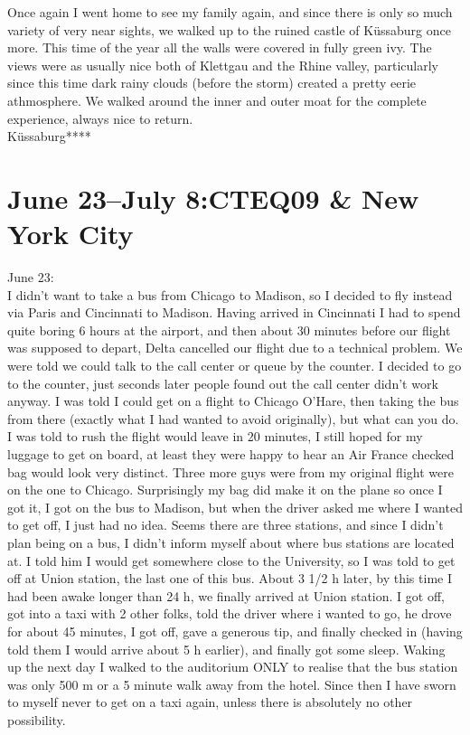 Once again I went home to see my family again, and since there is only so much variety of very near sights, we walked up to the ruined castle of K\"ussaburg once more. This time of the year all the walls were covered in fully green ivy. The views were as usually nice both of Klettgau and the Rhine valley, particularly since this time dark rainy clouds (before the storm) created a pretty eerie athmosphere. We walked around the inner and outer moat for the complete experience, always nice to return.\\

K\"ussaburg****

\section{June 23--July 8:CTEQ09 \& New York City}
\label{2009:US}

June 23:\\
I didn't want to take a bus from Chicago to Madison, so I decided to fly instead via Paris and Cincinnati to Madison. Having arrived in Cincinnati I had to spend quite boring 6 hours at the airport, and then about 30 minutes before our flight was supposed to depart, Delta cancelled our flight due to a technical problem. We were told we could talk to the call center or queue by the counter. I decided to go to the counter, just seconds later people found out the call center didn't work anyway. I was told I could get on a flight to Chicago O'Hare, then taking the bus from there (exactly what I had wanted to avoid originally), but what can you do. I was told to rush the flight would leave in 20 minutes, I still hoped for my luggage to get on board, at least they were happy to hear an Air France checked bag would look very distinct. Three more guys were from my original flight were on the one to Chicago. Surprisingly my bag did make it on the plane so once I got it, I got on the bus to Madison, but when the driver asked me where I wanted to get off, I just had no idea. Seems there are three stations, and since I didn't plan being on a bus, I didn't inform myself about where bus stations are located at. I told him I would get somewhere close to the University, so I was told to get off at Union station, the last one of this bus. About 3 1/2 h later, by this time I had been awake longer than 24 h, we finally arrived at Union station. I got off, got into a taxi with 2 other folks, told the driver where i wanted to go, he drove for about 45 minutes, I got off, gave a generous tip, and finally checked in (having told them I would arrive about 5 h earlier), and finally got some sleep. Waking up the next day I walked to the auditorium ONLY to realise that the bus station was only 500 m or a 5 minute walk away from the hotel. Since then I have sworn to myself never to get on a taxi again, unless there is absolutely no other possibility.\\

